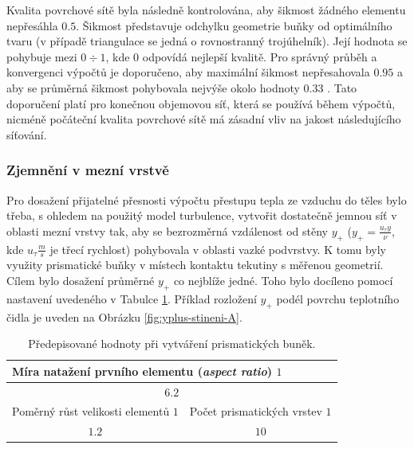             Kvalita povrchové sítě byla následně kontrolována, aby šikmost žádného elementu nepřesáhla $0.5$. Šikmost představuje odchylku geometrie buňky od optimálního tvaru (v případě triangulace se jedná o rovnostranný trojúhelník). Její hodnota se pohybuje mezi $0 \div 1$, kde $0$ odpovídá nejlepší kvalitě. Pro správný průběh a konvergenci výpočtů je doporučeno, aby maximální šikmost nepřesahovala $0.95$ a aby se průměrná šikmost pohybovala nejvýše okolo hodnoty $0.33$ \cite{Ansys2020User}. Tato doporučení platí pro konečnou objemovou síť, která se používá během výpočtů, nicméně počáteční kvalita povrchové sítě má zásadní vliv na jakost následujícího síťování.
        \subsubsection{Zjemnění v mezní vrstvě}
            Pro dosažení přijatelné přesnosti výpočtu přestupu tepla ze vzduchu do těles bylo třeba, s ohledem na použitý model turbulence, vytvořit dostatečně jemnou síť v oblasti mezní vrstvy tak, aby se bezrozměrná vzdálenost od stěny $y _+$ ($y _+ = \frac{u _\tau y}{\nu}$, kde $u _\tau \unit{\frac{m}{s}}$ je třecí rychlost) pohybovala v oblasti vazké podvrstvy. K tomu byly využity prismatické buňky v místech kontaktu tekutiny s měřenou geometrií. Cílem bylo dosažení průměrné $y_+$ co nejblíže jedné. Toho bylo docíleno pomocí nastavení uvedeného v Tabulce \ref{tab:mezni-vrstva-nastaveni}. Příklad rozložení $y_+$ podél povrchu teplotního čidla je uveden na Obrázku \ref{fig:yplus-stineni-A}.

            \begin{table}[ht!]
                \centering
                \begin{tabular}{ll}
                    \multicolumn{2}{l}{Míra natažení prvního elementu (\textit{aspect ratio}) $\unit{1}$}                            \\ \hline
                    \multicolumn{2}{c}{$6.2$}                                                                        \\ \hline
                    \multicolumn{1}{l|}{Poměrný růst velikosti elementů $\unit{1}$} & Počet prismatických vrstev $\unit{1}$ \\ \hline
                    \multicolumn{1}{c|}{$1.2$}                                      & \multicolumn{1}{c}{$10$}                
                \end{tabular}
                \caption{Předepisované hodnoty při vytváření prismatických buněk.}
                \label{tab:mezni-vrstva-nastaveni}
            \end{table}

